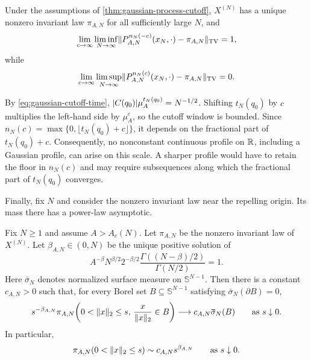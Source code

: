 \documentclass[11pt,reqno,a4paper]{article}
\newcommand{\TV}{\mathrm{TV}}
\begin{document}
\begin{corollary}
\label{cor:gaussian-vector-cutoff}
  Under the assumptions of \cref{thm:gaussian-process-cutoff}, $X^{(N)}$ has
  a unique nonzero invariant law $\pi_{A,N}$ for all
  sufficiently large $N$, and
  \begin{equation}\label{eq:gaussian-vector-cutoff-lower}
    \lim_{c\to\infty}\liminf_{N\to\infty}
    \norm{P_{A,N}^{n_N(-c)}(x_N,\cdot)-\pi_{A,N}}_{\TV}
    =1,
  \end{equation}
  while
  \begin{equation}\label{eq:gaussian-vector-cutoff-upper}
    \lim_{c\to\infty}\limsup_{N\to\infty}
    \norm{P_{A,N}^{n_N(c)}(x_N,\cdot)-\pi_{A,N}}_{\TV}
    =0.
  \end{equation}
\end{corollary}

By \cref{eq:gaussian-cutoff-time},
$\abs{C(q_0)}\mu_A^{t_N(q_0)}=N^{-1/2}$. Shifting $t_N(q_0)$ by $c$
multiplies the left-hand side by $\mu_A^c$, so the cutoff window is bounded.
Since $n_N(c)=\max\{0,\lfloor t_N(q_0)+c\rfloor\}$, it depends on the
fractional part of $t_N(q_0)+c$. Consequently, no nonconstant continuous
profile on $\mathbb{R}$, including a Gaussian profile, can arise on this scale. A
sharper profile would have to retain the floor in $n_N(c)$ and may require
subsequences along which the fractional part of $t_N(q_0)$ converges.

Finally, fix $N$ and consider the nonzero invariant law near the repelling
origin. Its mass there has a power-law asymptotic.

\begin{theorem}
\label{thm:nd-power-singularity:intro}
  Fix $N\geq1$ and assume $A>A_c(N)$. Let $\pi_{A,N}$ be the nonzero invariant
  law of $X^{(N)}$. Let $\beta_{A,N}\in(0,N)$ be the unique
  positive solution of
  \begin{equation*}
    A^{-\beta}N^{\beta/2}2^{-\beta/2}
    \frac{\Gamma((N-\beta)/2)}{\Gamma(N/2)}
    =
    1.
  \end{equation*}
  Here $\bar\sigma_N$ denotes normalized surface measure on
  $\mathbb S^{N-1}$. Then there is a constant $c_{A,N}>0$ such that, for every
  Borel set
  $B\subseteq\mathbb S^{N-1}$ satisfying $\bar\sigma_N(\partial B)=0$,
  \begin{equation*}
    s^{-\beta_{A,N}}\pi_{A,N}\left(
      0<\norm{x}_2\leq s,\,
      \frac{x}{\norm{x}_2}\in B
    \right)
    \longrightarrow
    c_{A,N}\bar\sigma_N(B)
    \qquad \mbox{as } s\downarrow0 .
  \end{equation*}
  In particular,
  \begin{equation*}
    \pi_{A,N}\left(0<\norm{x}_2\leq s\right)
    \sim
    c_{A,N}s^{\beta_{A,N}}
    \qquad \mbox{as } s\downarrow0 .
  \end{equation*}
\end{theorem}
\end{document}

